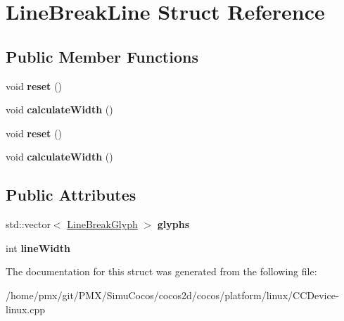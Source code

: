 \hypertarget{structLineBreakLine}{}\section{Line\+Break\+Line Struct Reference}
\label{structLineBreakLine}
\subsection*{Public Member Functions}
\begin{DoxyCompactItemize}
\item 
\mbox{\label{structLineBreakLine_abfe89bf2414d8a9b8442d16f119d5507}} 
void {\bfseries reset} ()
\item 
\mbox{\label{structLineBreakLine_a0a1cd339c7339f3b2b0c0513a5f41ac8}} 
void {\bfseries calculate\+Width} ()
\item 
\mbox{\label{structLineBreakLine_abfe89bf2414d8a9b8442d16f119d5507}} 
void {\bfseries reset} ()
\item 
\mbox{\label{structLineBreakLine_a0a1cd339c7339f3b2b0c0513a5f41ac8}} 
void {\bfseries calculate\+Width} ()
\end{DoxyCompactItemize}
\subsection*{Public Attributes}
\begin{DoxyCompactItemize}
\item 
\mbox{\label{structLineBreakLine_a1a2ed562b451fd1b51bac555403adb84}} 
std\+::vector$<$ \hyperlink{structLineBreakGlyph}{Line\+Break\+Glyph} $>$ {\bfseries glyphs}
\item 
\mbox{\label{structLineBreakLine_a1d59c4c1e49066e6e6e62cc688d69708}} 
int {\bfseries line\+Width}
\end{DoxyCompactItemize}


The documentation for this struct was generated from the following file\+:\begin{DoxyCompactItemize}
\item 
/home/pmx/git/\+P\+M\+X/\+Simu\+Cocos/cocos2d/cocos/platform/linux/C\+C\+Device-\/linux.\+cpp\end{DoxyCompactItemize}
